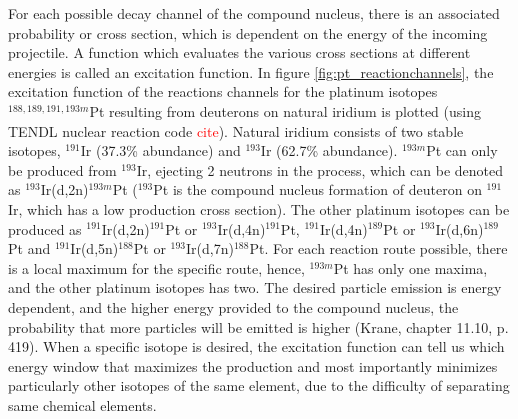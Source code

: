 \noindent For each possible decay channel of the compound nucleus, there is an associated probability or cross section, which is dependent on the energy of the incoming projectile. A function which evaluates the various cross sections at different energies is called an excitation function. In figure \ref{fig:pt_reactionchannels}, the excitation function of the reactions channels for the platinum isotopes $^{188, 189, 191,193m}$Pt resulting from deuterons on natural iridium is plotted (using TENDL nuclear reaction code \textcolor{red}{cite}). Natural iridium consists of two stable isotopes, $^{191}$Ir (37.3\% abundance) and $^{193}$Ir (62.7\% abundance). $^{193m}$Pt can only be produced from $^{193}$Ir, ejecting 2 neutrons in the process, which can be denoted as $^{193}$Ir(d,2n)$^{193m}$Pt ($^{193}$Pt is the compound nucleus formation of deuteron on $^{191}$Ir, which has a low production cross section). The other platinum isotopes can be produced as $^{191}$Ir(d,2n)$^{191}$Pt or $^{193}$Ir(d,4n)$^{191}$Pt, $^{191}$Ir(d,4n)$^{189}$Pt or $^{193}$Ir(d,6n)$^{189}$Pt and $^{191}$Ir(d,5n)$^{188}$Pt or $^{193}$Ir(d,7n)$^{188}$Pt. For each reaction route possible, there is a local maximum for the specific route, hence, $^{193m}$Pt has only one maxima, and the other platinum isotopes has two. The desired particle emission is energy dependent, and the higher energy provided to the compound nucleus, the probability that more particles will be emitted is higher (Krane, chapter 11.10, p. 419). When a specific isotope is desired, the excitation function can tell us which energy window that maximizes the production and most importantly minimizes particularly other isotopes of the same element, due to the difficulty of separating same chemical elements. \\

